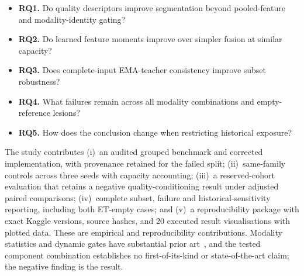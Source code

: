 \begin{itemize} \item \textbf{RQ1.} Do quality descriptors improve segmentation beyond pooled-feature and modality-identity gating? \item \textbf{RQ2.} Do learned feature moments improve over simpler fusion at similar capacity? \item \textbf{RQ3.} Does complete-input EMA-teacher consistency improve subset robustness? \item \textbf{RQ4.} What failures remain across all modality combinations and empty-reference lesions? \item \textbf{RQ5.} How does the conclusion change when restricting historical exposure?
\end{itemize} The study contributes (i)~an audited grouped benchmark and corrected implementation, with provenance retained for the failed split; (ii)~same-family controls across three seeds with capacity accounting; (iii)~a reserved-cohort evaluation that retains a negative quality-conditioning result under adjusted paired comparisons; (iv)~complete subset, failure and historical-sensitivity reporting, including both ET-empty cases; and (v)~a reproducibility package with exact Kaggle versions, source hashes, and 20 executed result visualisations with plotted data. These are empirical and reproducibility contributions. Modality statistics and dynamic gates have substantial prior art~\cite{havaei2016hemis,li2025simmlm}, and the tested component combination establishes no first-of-its-kind or state-of-the-art claim; the negative finding is the result.
